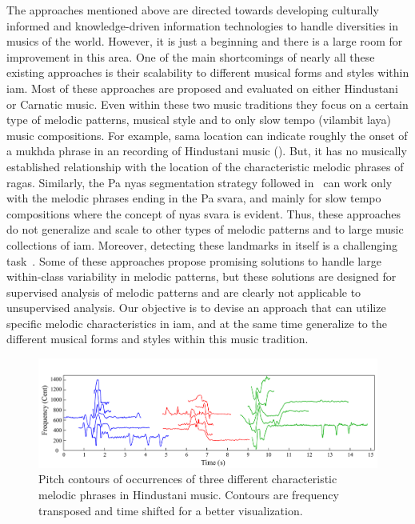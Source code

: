 The approaches mentioned above are directed towards developing culturally informed and knowledge-driven information technologies to handle diversities in musics of the world. However, it is just a beginning and there is a large room for improvement in this area. One of the main shortcomings of nearly all these existing approaches is their scalability to different musical forms and styles within \gls{iam}. Most of these approaches are proposed and evaluated on either Hindustani or Carnatic music. Even within these two music traditions they focus on a certain type of melodic patterns, musical style and to only slow tempo (vilambit laya) music compositions. For example, \gls{sama} location can indicate roughly the onset of a \gls{mukhda} phrase in an recording of Hindustani music (\citep{Ross2012b}). But, it has no musically established relationship with the location of the characteristic melodic phrases of \glspl{raga}. Similarly, the Pa \gls{nyas} segmentation strategy followed in~\cite{Ross2012} can work only with the melodic phrases ending in the Pa \gls{svara}, and mainly for slow tempo compositions where the concept of \gls{nyas} \gls{svara} is evident. Thus, these approaches do not generalize and scale to other types of melodic patterns and to large music collections of \gls{iam}. Moreover, detecting these landmarks in itself is a challenging task~\citep{srinivasamurthy2014supervised,gulati2014Landmark}. Some of these approaches propose promising solutions to handle large within-class variability in melodic patterns, but these solutions are designed for supervised analysis of melodic patterns and are clearly not applicable to unsupervised analysis. Our objective is to devise an approach that can utilize specific melodic characteristics in \gls{iam}, and at the same time generalize to the different musical forms and styles within this music tradition.

\begin{figure}
	\begin{center}
		\includegraphics[width=\figSizeHundred]{ch06_patterns/figures/ImprovingSimilarity/phraseClassesExample.pdf}
	\end{center}
	\caption{Pitch contours of occurrences of three different characteristic melodic phrases in Hindustani music. Contours are frequency transposed and time shifted for a better visualization.}
	\label{fig:phraseComplexityExample}
\end{figure}

